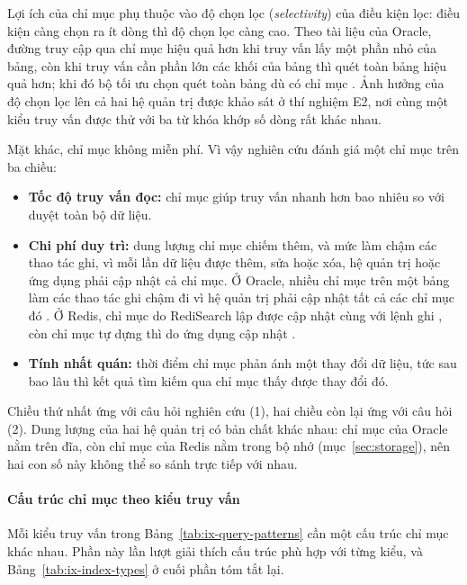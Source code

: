 Lợi ích của chỉ mục phụ thuộc vào độ chọn lọc (\emph{selectivity}) của điều kiện lọc: điều kiện càng chọn ra ít dòng thì độ chọn lọc càng cao. Theo tài liệu của Oracle, đường truy cập qua chỉ mục hiệu quả hơn khi truy vấn lấy một phần nhỏ của bảng, còn khi truy vấn cần phần lớn các khối của bảng thì quét toàn bảng hiệu quả hơn; khi đó bộ tối ưu chọn quét toàn bảng dù có chỉ mục \cite{oracleAccessPaths}. Ảnh hưởng của độ chọn lọc lên cả hai hệ quản trị được khảo sát ở thí nghiệm E2, nơi cùng một kiểu truy vấn được thử với ba từ khóa khớp số dòng rất khác nhau.

Mặt khác, chỉ mục không miễn phí. Vì vậy nghiên cứu đánh giá một chỉ mục trên ba chiều:

\begin{itemize}[label=--,leftmargin=*,itemsep=2pt,topsep=4pt]
    \item \textbf{Tốc độ truy vấn đọc:} chỉ mục giúp truy vấn nhanh hơn bao nhiêu so với duyệt toàn bộ dữ liệu.
    \item \textbf{Chi phí duy trì:} dung lượng chỉ mục chiếm thêm, và mức làm chậm các thao tác ghi, vì mỗi lần dữ liệu được thêm, sửa hoặc xóa, hệ quản trị hoặc ứng dụng phải cập nhật cả chỉ mục. Ở Oracle, nhiều chỉ mục trên một bảng làm các thao tác ghi chậm đi vì hệ quản trị phải cập nhật tất cả các chỉ mục đó \cite{oracleIndexes}. Ở Redis, chỉ mục do RediSearch lập được cập nhật cùng với lệnh ghi \cite{redisJsonIndexing}, còn chỉ mục tự dựng thì do ứng dụng cập nhật \cite{redisSecondaryIndexing}.
    \item \textbf{Tính nhất quán:} thời điểm chỉ mục phản ánh một thay đổi dữ liệu, tức sau bao lâu thì kết quả tìm kiếm qua chỉ mục thấy được thay đổi đó.
\end{itemize}

Chiều thứ nhất ứng với câu hỏi nghiên cứu (1), hai chiều còn lại ứng với câu hỏi (2). Dung lượng của hai hệ quản trị có bản chất khác nhau: chỉ mục của Oracle nằm trên đĩa, còn chỉ mục của Redis nằm trong bộ nhớ (mục~\ref{sec:storage}), nên hai con số này không thể so sánh trực tiếp với nhau.

\paragraph{Cấu trúc chỉ mục theo kiểu truy vấn}\label{sec:ix-structures}

Mỗi kiểu truy vấn trong Bảng~\ref{tab:ix-query-patterns} cần một cấu trúc chỉ mục khác nhau. Phần này lần lượt giải thích cấu trúc phù hợp với từng kiểu, và Bảng~\ref{tab:ix-index-types} ở cuối phần tóm tắt lại.

